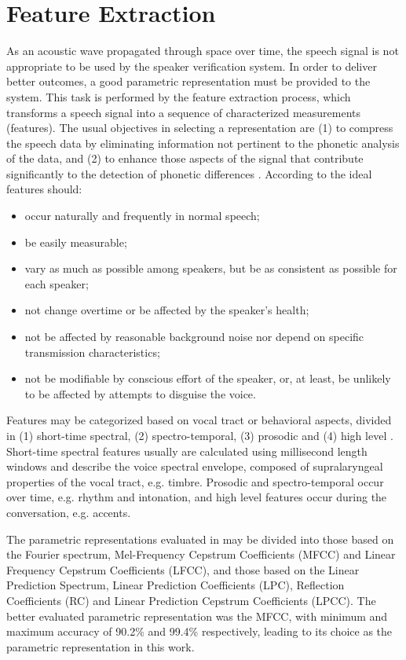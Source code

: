 \chapter{Feature Extraction}

As an acoustic wave propagated through space over time, the speech signal is not
appropriate to be used by the speaker verification system. In order to deliver
better outcomes, a good parametric representation must be provided to the system.
This task is performed by the feature extraction process, which transforms a speech
signal into a sequence of characterized measurements (features). The usual objectives
in selecting a representation are (1) to compress the speech data by eliminating
information not pertinent to the phonetic analysis of the data, and (2) to enhance
those aspects of the signal that contribute significantly to the detection of
phonetic differences \autocite{davis.mermelstein.1980}. According to \autocite{wolf.1972}
the ideal features should:

\begin{itemize}\itemsep0pt\parskip0pt
    \item occur naturally and frequently in normal speech;
    \item be easily measurable;
    \item vary as much as possible among speakers, but be as consistent as possible
    for each speaker;
    \item not change overtime or be affected by the speaker's health;
    \item not be affected by reasonable background noise nor depend on specific
    transmission characteristics;
    \item not be modifiable by conscious effort of the speaker, or, at least, be
    unlikely to be affected by attempts to disguise the voice.
\end{itemize}

Features may be categorized based on vocal tract or behavioral aspects, divided
in (1) short-time spectral, (2) spectro-temporal, (3) prosodic and (4) high
level \autocite{pinheiro.2013}. Short-time spectral features usually are calculated
using millisecond length windows and describe the voice spectral envelope, composed
of supralaryngeal properties of the vocal tract, e.g. timbre. Prosodic and
spectro-temporal occur over time, e.g. rhythm and intonation, and high level features
occur during the conversation, e.g. accents.

The parametric representations evaluated in \autocite{davis.mermelstein.1980} may
be divided into those based on the Fourier spectrum, Mel-Frequency Cepstrum
Coefficients (MFCC) and Linear Frequency Cepstrum Coefficients (LFCC), and those
based on the Linear Prediction Spectrum, Linear Prediction Coefficients (LPC),
Reflection Coefficients (RC) and Linear Prediction Cepstrum Coefficients (LPCC).
The better evaluated parametric representation was the MFCC, with minimum and
maximum accuracy of 90.2\% and 99.4\% respectively, leading to its choice as the
parametric representation in this work.


